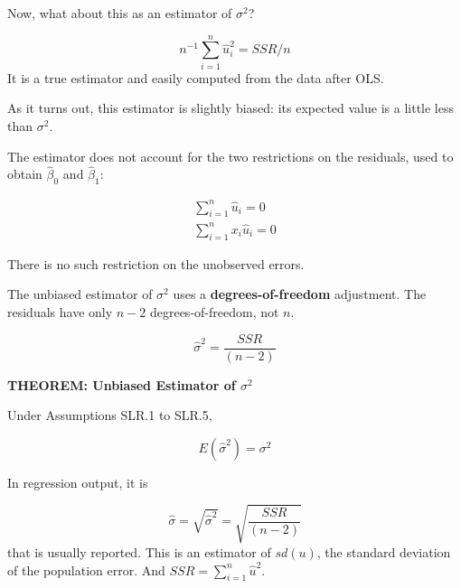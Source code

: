 \documentclass[notes=show]{beamer}
\begin{document}
\begin{frame}[plain]

Now, what about this as an estimator of $\sigma ^{2}$?

 \begin{equation}
  n^{-1}\sum_{i=1}^{n}\hat{u}_{i}^{2}=SSR/n
 \end{equation}
 It is a true estimator and easily computed from the data after OLS.

 As it turns out, this estimator is slightly biased: its expected value is a little less than $\sigma ^{2}$.
\end{frame}

\begin{frame}[plain]

 The estimator does not account for the two restrictions on the residuals, used to obtain $\hat{\beta}_{0}$ and $\hat{\beta}_{1}$:

 \begin{eqnarray*}
  \sum_{i=1}^{n}\hat{u}_{i}=0 \\
  \sum_{i=1}^{n}x_{i}\hat{u}_{i}=0
 \end{eqnarray*}

 There is no such restriction on the unobserved errors.
\end{frame}

\begin{frame}[plain]

 The unbiased estimator of $\sigma ^{2}$ uses a \textbf{degrees-of-freedom} adjustment. The residuals have only $n-2$ degrees-of-freedom, not $n$.

 \begin{equation}
  \hat{\sigma}^{2}=\frac{SSR}{(n-2)}
 \end{equation}

\textbf{THEOREM: Unbiased Estimator of $\sigma ^{2}$}

Under Assumptions SLR.1 to SLR.5,

 \begin{equation}
  E(\hat{\sigma}^{2})=\sigma ^{2}
 \end{equation}

\end{frame}

\begin{frame}[plain]

In regression output, it is

 \begin{equation}
  \hat{\sigma}=\sqrt{\hat{\sigma}^{2}}=\sqrt{\frac{SSR}{(n-2)}}
 \end{equation}
that is usually reported. This is an estimator of $sd(u)$, the standard deviation of the population error.  And $SSR=\sum_{i=1}^n \widehat{u}^2$.

\end{frame}
\end{document}
